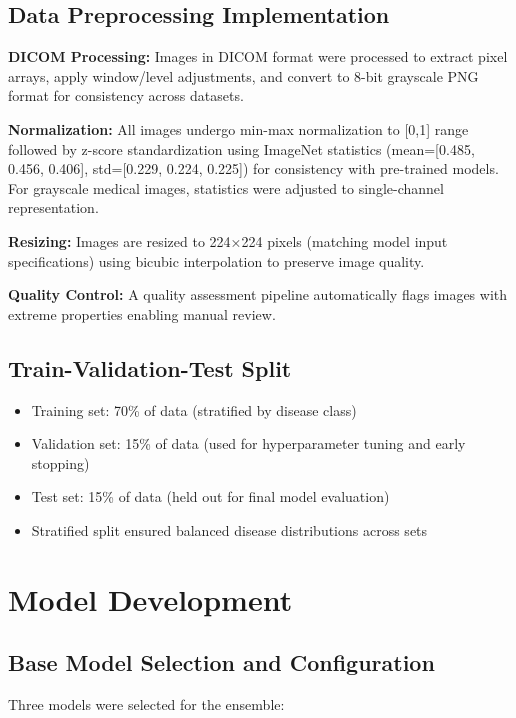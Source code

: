 {\subsection{Data Preprocessing Implementation}

\textbf{DICOM Processing:}
Images in DICOM format were processed to extract pixel arrays, apply window/level adjustments, and convert to 8-bit grayscale PNG format for consistency across datasets.

\textbf{Normalization:}
All images undergo min-max normalization to [0,1] range followed by z-score standardization using ImageNet statistics (mean=[0.485, 0.456, 0.406], std=[0.229, 0.224, 0.225]) for consistency with pre-trained models. For grayscale medical images, statistics were adjusted to single-channel representation.

\textbf{Resizing:}
Images are resized to 224×224 pixels (matching model input specifications) using bicubic interpolation to preserve image quality.

\textbf{Quality Control:}
A quality assessment pipeline automatically flags images with extreme properties enabling manual review.

\subsection{Train-Validation-Test Split}

\begin{itemize}
    \item Training set: 70\% of data (stratified by disease class)
    \item Validation set: 15\% of data (used for hyperparameter tuning and early stopping)
    \item Test set: 15\% of data (held out for final model evaluation)
    \item Stratified split ensured balanced disease distributions across sets
\end{itemize}

\section{Model Development}

\subsection{Base Model Selection and Configuration}

Three models were selected for the ensemble:

}

